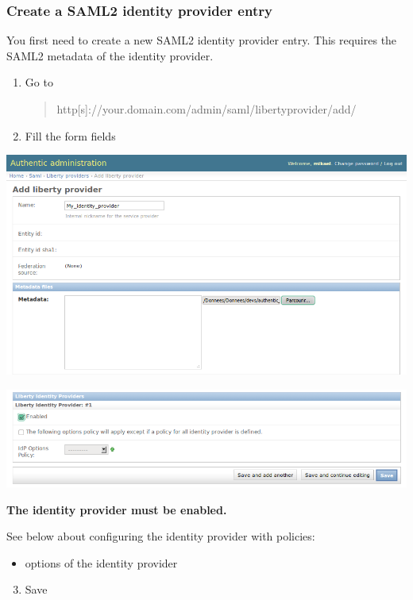 \documentclass[letterpaper,10pt,english]{sphinxmanual}
\begin{document}
\subsubsection{Create a SAML2 identity provider entry}
\label{config_saml2_idp:create-a-saml2-identity-provider-entry}
You first need to create a new SAML2 identity provider entry. This requires
the SAML2 metadata of the identity provider.
\begin{enumerate}
\item {} 
Go to
\begin{quote}

http{[}s{]}://your.domain.com/admin/saml/libertyprovider/add/
\end{quote}

\item {} 
Fill the form fields

\end{enumerate}

\includegraphics{new_saml2_idp_1.png}

\includegraphics{new_saml2_idp_2.png}

\textbf{The identity provider must be enabled.}

See below about configuring the identity provider with policies:
\begin{itemize}
\item {} 
options of the identity provider

\end{itemize}
\begin{enumerate}
\setcounter{enumi}{2}
\item {} 
Save

\end{enumerate}
\end{document}
